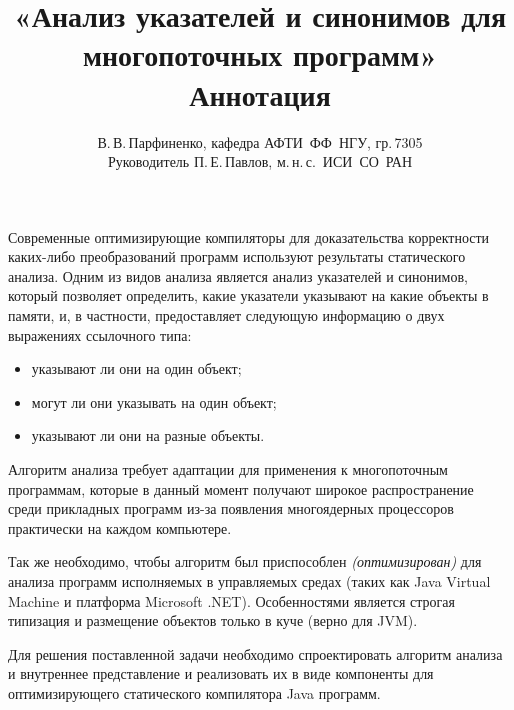 \documentclass[11pt]{article}
\title{
  «Анализ указателей и синонимов для многопоточных программ»\\
  Аннотация
}
\author{
  В.\,В.\,Парфиненко, кафедра АФТИ~ФФ~НГУ, гр.\,7305\\
  Руководитель П.\,Е.\,Павлов, м.\,н.\,с.~ИСИ~СО~РАН
}
\begin{document}
  \maketitle

  \thispagestyle{empty}

    Современные оптимизирующие компиляторы для доказательства корректности
    каких-либо преобразований программ используют результаты
    статического анализа.
    Одним из видов анализа является анализ указателей и синонимов, который
    позволяет определить, какие указатели указывают на какие объекты в памяти,
    и, в частности, предоставляет следующую информацию о двух выражениях
    ссылочного типа:
    \begin{itemize}
      \item указывают ли они на один объект;
      \item могут ли они указывать на один объект;
      \item указывают ли они на разные объекты.
    \end{itemize}

    Алгоритм анализа требует адаптации для применения к многопоточным
    программам, которые в данный момент получают широкое распространение среди
    прикладных программ из-за появления многоядерных процессоров практически
    на каждом компьютере.

    Так же необходимо, чтобы алгоритм был приспособлен \textit{(оптимизирован)}
    для анализа программ исполняемых в управляемых средах (таких как
    Java Virtual Machine и платформа Microsoft .NET).
    Особенностями является строгая типизация и размещение объектов
    только в куче (верно для JVM).

    Для решения поставленной задачи необходимо спроектировать алгоритм
    анализа и внутреннее представление и реализовать их в виде компоненты
    для оптимизирующего статического компилятора Java программ.
\end{document}
